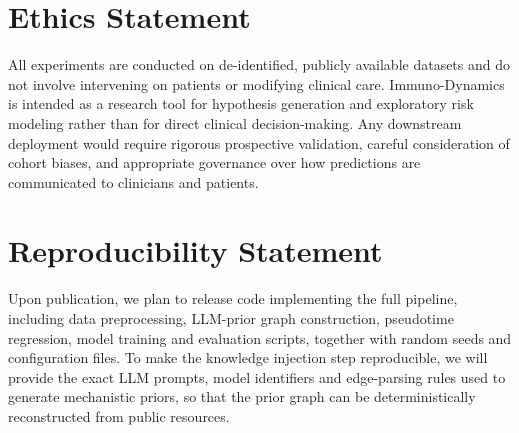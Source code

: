 \documentclass{article}
\begin{document}
\section*{Ethics Statement}

All experiments are conducted on de-identified, publicly available datasets and do not involve intervening on patients or modifying clinical care.
Immuno-Dynamics is intended as a research tool for hypothesis generation and exploratory risk modeling rather than for direct clinical decision-making.
Any downstream deployment would require rigorous prospective validation, careful consideration of cohort biases, and appropriate governance over how predictions are communicated to clinicians and patients.

\section*{Reproducibility Statement}

Upon publication, we plan to release code implementing the full pipeline, including data preprocessing, LLM-prior graph construction, pseudotime regression, model training and evaluation scripts, together with random seeds and configuration files.
To make the knowledge injection step reproducible, we will provide the exact LLM prompts, model identifiers and edge-parsing rules used to generate mechanistic priors, so that the prior graph can be deterministically reconstructed from public resources.



\end{document}
